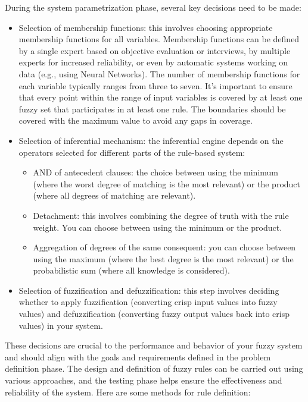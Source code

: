 During the system parametrization phase, several key decisions need to be made:
\begin{itemize}
    \item Selection of membership functions: this involves choosing appropriate membership functions for all variables. 
        Membership functions can be defined by a single expert based on objective evaluation or interviews, by multiple experts for increased reliability, or even by automatic systems working on data (e.g., using Neural Networks). 
        The number of membership functions for each variable typically ranges from three to seven. 
        It's important to ensure that every point within the range of input variables is covered by at least one fuzzy set that participates in at least one rule. 
        The boundaries should be covered with the maximum value to avoid any gaps in coverage.
    \item Selection of inferential mechanism: the inferential engine depends on the operators selected for different parts of the rule-based system:
        \begin{itemize}
            \item AND of antecedent clauses: the choice between using the minimum (where the worst degree of matching is the most relevant) or the product (where all degrees of matching are relevant).
            \item Detachment: this involves combining the degree of truth with the rule weight. 
                You can choose between using the minimum or the product.
            \item Aggregation of degrees of the same consequent: you can choose between using the maximum (where the best degree is the most relevant) or the probabilistic sum (where all knowledge is considered).
        \end{itemize}
    \item Selection of fuzzification and defuzzification: this step involves deciding whether to apply fuzzification (converting crisp input values into fuzzy values) and defuzzification (converting fuzzy output values back into crisp values) in your system.
\end{itemize}
These decisions are crucial to the performance and behavior of your fuzzy system and should align with the goals and requirements defined in the problem definition phase.
The design and definition of fuzzy rules can be carried out using various approaches, and the testing phase helps ensure the effectiveness and reliability of the system. Here are some methods for rule definition: 
